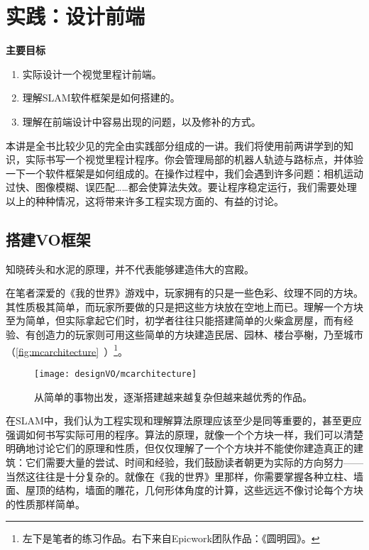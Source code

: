 \chapter{实践：设计前端}
\begin{mdframed}  
	\textbf{主要目标}
	\begin{enumerate}[labelindent=0em,leftmargin=1.5em]
		\item 实际设计一个视觉里程计前端。
		\item 理解SLAM软件框架是如何搭建的。
		\item 理解在前端设计中容易出现的问题，以及修补的方式。
	\end{enumerate}
\end{mdframed}

本讲是全书比较少见的完全由实践部分组成的一讲。我们将使用前两讲学到的知识，实际书写一个视觉里程计程序。你会管理局部的机器人轨迹与路标点，并体验一下一个软件框架是如何组成的。在操作过程中，我们会遇到许多问题：相机运动过快、图像模糊、误匹配……都会使算法失效。要让程序稳定运行，我们需要处理以上的种种情况，这将带来许多工程实现方面的、有益的讨论。

\newpage 
\section{搭建VO框架}
知晓砖头和水泥的原理，并不代表能够建造伟大的宫殿。

在笔者深爱的《我的世界》游戏中，玩家拥有的只是一些色彩、纹理不同的方块。其性质极其简单，而玩家所要做的只是把这些方块放在空地上而已。理解一个方块至为简单，但实际拿起它们时，初学者往往只能搭建简单的火柴盒房屋，而有经验、有创造力的玩家则可用这些简单的方块建造民居、园林、楼台亭榭，乃至城市（\autoref{fig:mcarchitecture}~）\footnote{左下是笔者的练习作品。右下来自Epicwork团队作品：《圆明园》。}。

\begin{figure}[!htp]
	\centering    
	\texttt{[image: designVO/mcarchitecture]}\\
	\caption{从简单的事物出发，逐渐搭建越来越复杂但越来越优秀的作品。}
	\label{fig:mcarchitecture}
\end{figure}

在SLAM中，我们认为工程实现和理解算法原理应该至少是同等重要的，甚至更应强调如何书写实际可用的程序。算法的原理，就像一个个方块一样，我们可以清楚明确地讨论它们的原理和性质，但仅仅理解了一个个方块并不能使你建造真正的建筑：它们需要大量的尝试、时间和经验，我们鼓励读者朝更为实际的方向努力——当然这往往是十分复杂的。就像在《我的世界》里那样，你需要掌握各种立柱、墙面、屋顶的结构，墙面的雕花，几何形体角度的计算，这些远远不像讨论每个方块的性质那样简单。

